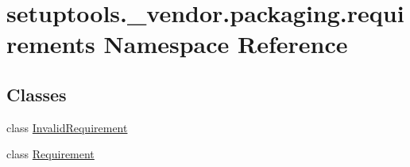 \hypertarget{namespacesetuptools_1_1__vendor_1_1packaging_1_1requirements}{}\section{setuptools.\+\_\+vendor.\+packaging.\+requirements Namespace Reference}
\label{namespacesetuptools_1_1__vendor_1_1packaging_1_1requirements}
\subsection*{Classes}
\begin{DoxyCompactItemize}
\item 
class \hyperlink{classsetuptools_1_1__vendor_1_1packaging_1_1requirements_1_1InvalidRequirement}{Invalid\+Requirement}
\item 
class \hyperlink{classsetuptools_1_1__vendor_1_1packaging_1_1requirements_1_1Requirement}{Requirement}
\end{DoxyCompactItemize}
